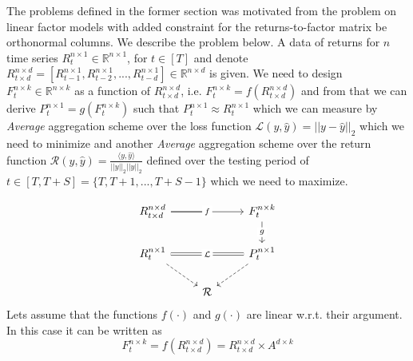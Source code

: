 {}

 \label{problem_linear_factor_model}
The problems defined in the former section was motivated from the problem on linear factor models with added constraint for the returns-to-factor matrix be orthonormal columns. We describe the problem below.\newline
\newline A data of returns for $n$ time series $R^{n\times 1}_t \in \mathbb{R}^{n\times 1}$, for $t\in [T]$ and denote $R^{n\times d}_{t\times d} = [R^{n\times 1}_{t-1},R^{n\times 1}_{t-2},...,R^{n\times 1}_{t-d}] \in \mathbb{R}^{n\times d}$ is given. 
\newline \newline We need to design $F^{n\times k}_t \in \mathbb{R}^{n\times k}$ as a function of $R^{n\times d}_{t\times d}$, i.e. $F^{n\times k}_t = f(R^{n\times d}_{t\times d})$ and from that we can derive $P^{n \times 1}_{t} = g(F^{n\times k}_t)$ such that $P^{n \times 1}_{t} \approx R^{n \times 1}_{t}$ which we can measure by \textit{Average} aggregation scheme over the loss function $\mathcal{L}(y,\hat{y}) = ||y-\hat{y}||_2$ which we need to minimize and another \textit{Average} aggregation scheme over the return function $\mathcal{R}(y,\hat{y}) = \frac{\langle y,\hat{y}\rangle}{||y||_2||\hat{y}||_2}$ defined over the testing period of $t \in [T,T+S]= \{T,T+1,...,T+S-1\}$ which we need to maximize.

\begin{equation} \label{lfm_diagram}
\begin{tikzcd}
R^{n\times d}_{t \times d} \arrow[rr, "f" description] \arrow[r, no head]& {}& F^{n\times k}_{t} \arrow[d, "g" description] \\
R^{n\times 1}_t \arrow[rr, "\mathcal{L}" description, Rightarrow, no head] \arrow[rd, dashed] && P^{n \times 1}_{t} \arrow[ld, dashed]\\
& \mathcal{R} &
\end{tikzcd}
\end{equation}
\newline
Lets assume that the functions $f(\cdot)$ and $g(\cdot)$ are linear w.r.t. their argument. In this case it can be written as
\begin{equation} \label{f_for_lfm}
F^{n\times k}_t = f(R^{n\times d}_{t\times d}) = R^{n\times d}_{t\times d}\times A^{d\times k}
\end{equation}

